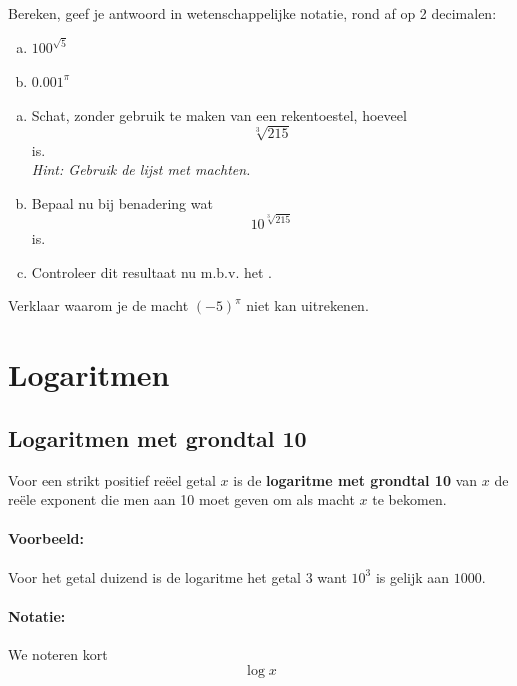 \documentclass[12pt,twoside,a4paper]{article}
\begin{document}
\begin{oefening}
Bereken, geef je antwoord in wetenschappelijke notatie, rond af op 2 decimalen:\\
\begin{enumerate}[(a)]
  \itemsep1.5em
  \item $100^{\sqrt{5}}$
  \item $0.001^\pi$
\end{enumerate}
\end{oefening}

\begin{oefening}
  \begin{enumerate}[(a)]
  \item Schat, zonder gebruik te maken van een rekentoestel, hoeveel
    $$\sqrt[3]{215}$$
    is.\\
    {\em Hint: Gebruik de lijst met machten.}
  \item Bepaal nu bij benadering wat
    $$10^{\sqrt[3]{215}}$$
    is.
    \item Controleer dit resultaat nu m.b.v. het .
  \end{enumerate}
\end{oefening}

\begin{oefening}
Verklaar waarom je  de macht $(-5)^\pi$ niet kan uitrekenen.
\end{oefening}

\cleardoublepage
\section{Logaritmen}

\subsection{Logaritmen met grondtal 10}

Voor een strikt positief reëel getal $x$ is de {\bf logaritme met grondtal 10} van $x$ de reële exponent die men aan 10 moet geven om als macht $x$ te bekomen.

\paragraph*{Voorbeeld:} Voor het getal duizend is de logaritme het getal $3$ want $10^3$ is gelijk aan $1000$.

\paragraph*{Notatie:} We noteren kort
$$\log x$$
\end{document}
